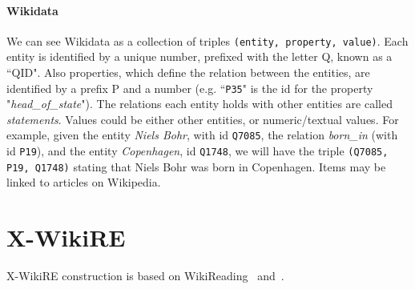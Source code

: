 

\paragraph{Wikidata}
We can see Wikidata as a collection of triples \texttt{(entity, property, value)}. Each entity is identified by a unique number, prefixed with the letter Q, known as a ``QID". Also properties, which define the relation between the entities, are identified by a prefix P and a number (e.g. ``\texttt{P35}" is the id for the property "\textit{head\_of\_state}"). The relations each entity holds with other entities are called \textit{statements}. Values could be either other entities, or numeric/textual values.  For example, given the entity \textit{Niels Bohr}, with id \texttt{Q7085}, the relation \textit{born\_in} (with id \texttt{P19}), and the entity \textit{Copenhagen}, id \texttt{Q1748}, we will have the triple \texttt{(Q7085, P19, Q1748)} stating that Niels Bohr was born in Copenhagen. Items may be linked to articles on Wikipedia.



\section{X-WikiRE}
X-WikiRE construction is based on WikiReading~\citep{hewlett2016wikireading} and~\citep{levy2017zero}. 




